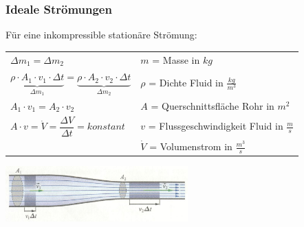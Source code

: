 	\subsubsection{Ideale Strömungen}
		\begin{minipage}{12cm}
				\begin{flushleft}
					Für eine inkompressible stationäre Strömung:
				\end{flushleft}
				\quad
				\renewcommand{\arraystretch}{2}
				\begin{tabular}{ p{5.5cm} | p{7cm}}
					$\Delta m_1 = \Delta m_2$	&	$m$ = Masse in $kg$\\
					$\underbrace{\rho \cdot A_1 \cdot v_1 \cdot \Delta t}_{\Delta m_1} = \underbrace{\rho \cdot A_2 \cdot v_2 \cdot \Delta t}_{\Delta m_2}$	&	$\rho$ = Dichte Fluid in $\frac{kg}{m^3}$\\
					$A_1 \cdot v_1 = A_2 \cdot v_2$	&	$A$ = Querschnittsfläche Rohr in $m^2$\\
					$A \cdot v = \dot{V} = \dfrac{\Delta V}{\Delta t} = konstant$	&	$v$ = Flussgeschwindigkeit Fluid in $\frac{m}{s}$\\
					&	$\dot{V}$ = Volumenstrom in $\frac{m^3}{s}$\\
				\end{tabular}
				\renewcommand{\arraystretch}{1}
		\end{minipage}
		\begin{minipage}{10cm}
			\vspace{-\ht\strutbox}\includegraphics[width=7cm]{./bilder/Kontinuitaetsgleichung.jpg}
		\end{minipage}
		\newline
		\newline
		\newline
		\newline
